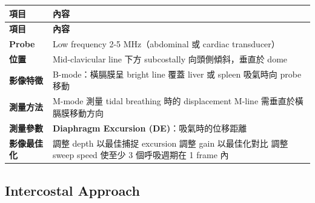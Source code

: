 \documentclass[12pt,a4paper]{article}
\begin{document}
\begin{longtable}{p{4cm}p{10cm}}
\toprule
\textbf{項目} & \textbf{內容} \\
\midrule
\endfirsthead

\toprule
\textbf{項目} & \textbf{內容} \\
\midrule
\endhead

\bottomrule
\endfoot

\textbf{Probe} & Low frequency 2-5 MHz（abdominal 或 cardiac transducer）\\
\midrule
\textbf{位置} & Mid-clavicular line 下方 subcostally\newline
向頭側傾斜，垂直於 dome \\
\midrule
\textbf{影像特徵} & B-mode：橫膈膜呈 bright line 覆蓋 liver 或 spleen\newline
吸氣時向 probe 移動 \\
\midrule
\textbf{測量方法} & M-mode 測量 tidal breathing 時的 displacement\newline
M-line 需垂直於橫膈膜移動方向 \\
\midrule
\textbf{測量參數} & \textbf{Diaphragm Excursion (DE)}：吸氣時的位移距離 \\
\midrule
\textbf{影像最佳化} & 調整 depth 以最佳捕捉 excursion\newline
調整 gain 以最佳化對比\newline
調整 sweep speed 使至少 3 個呼吸週期在 1 frame 內 \\
\bottomrule
\end{longtable}

\subsection{Intercostal Approach}
\end{document}
